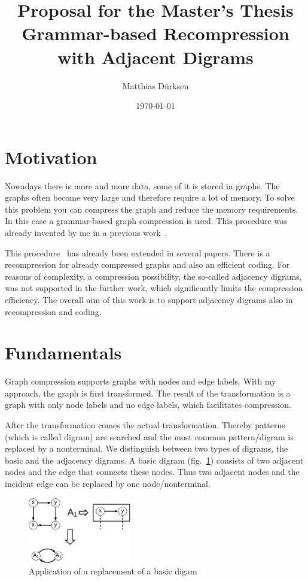 \documentclass[a4paper]{scrartcl}
\title{Proposal for the Master's Thesis\\Grammar-based Recompression with Adjacent Digrams}
\author{Matthias Dürksen}
\date{\today}
\begin{document}
\maketitle

\section{Motivation}\label{sec:motivation}

Nowadays there is more and more data, some of it is stored in graphs. The graphs often become very large and therefore require a lot of memory. To solve this problem you can compress the graph and reduce the memory requirements. In this case a grammar-based graph compression is used. This procedure was already invented by me in a previous work~\cite{mattdk}.

This procedure~\cite{mattdk} has already been extended in several papers. There is a recompression for already compressed graphs and also an efficient coding. For reasons of complexity, a compression possibility, the so-called adjacency digrams, was not supported in the further work, which significantly limits the compression efficiency. 
The overall aim of this work is to support adjacency digrams also in recompression and coding.



\section{Fundamentals}


Graph compression supports graphs with nodes and edge labels. With my approach, the graph is first transformed. The result of the transformation is a graph with only node labels and no edge labels, which facilitates compression. 

After the transformation comes the actual transformation. Thereby patterns (which is called digram) are searched and the most common pattern/digram is replaced by a nonterminal.
We distinguish between two types of digrams, the basic and the adjacency digrams.
A basic digram (fig.~\ref{fig:basicDigram}) consists of two adjacent nodes and the edge that connects these nodes. Thus two adjacent nodes and the incident edge can be replaced by one node/nonterminal.
\begin{figure}[h]
	\centering
	\includegraphics[width=0.4\textwidth]{img/basicDigram}
	\caption{Application of a replacement of a basic digam}
	\label{fig:basicDigram}
\end{figure}
\end{document}
